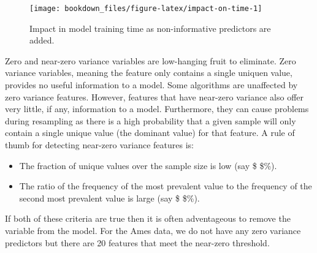 \documentclass[]{krantz}
\providecommand{\tightlist}{%
  \setlength{\itemsep}{0pt}\setlength{\parskip}{0pt}}
\begin{document}
\begin{figure}

{\centering \texttt{[image: bookdown\_files/figure-latex/impact-on-time-1]} 

}

\caption{Impact in model training time as non-informative predictors are added.}\label{fig:impact-on-time}
\end{figure}

Zero and near-zero variance variables are low-hanging fruit to eliminate. Zero variance variables, meaning the feature only contains a single uniquen value, provides no useful information to a model. Some algorithms are unaffected by zero variance features. However, features that have near-zero variance also offer very little, if any, information to a model. Furthermore, they can cause problems during resampling as there is a high probability that a given sample will only contain a single unique value (the dominant value) for that feature. A rule of thumb for detecting near-zero variance features is:

\begin{itemize}
\tightlist
\item
  The fraction of unique values over the sample size is low (say \$ \$\%).
\item
  The ratio of the frequency of the most prevalent value to the frequency of the second most prevalent value is large (say \$ \$\%).
\end{itemize}

If both of these criteria are true then it is often adventageous to remove the variable from the model. For the Ames data, we do not have any zero variance predictors but there are 20 features that meet the near-zero threshold.
\end{document}
